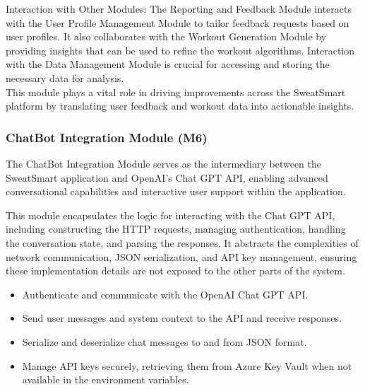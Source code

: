 \documentclass[12pt, titlepage]{article}
\begin{document}
Interaction with Other Modules: The Reporting and Feedback Module interacts with the User Profile Management Module to tailor feedback requests based on user profiles. It also collaborates with the Workout Generation Module by providing insights that can be used to refine the workout algorithms. Interaction with the Data Management Module is crucial for accessing and storing the necessary data for analysis.
\\

This module plays a vital role in driving improvements across the SweatSmart platform by translating user feedback and workout data into actionable insights.

\subsubsection{ChatBot Integration Module (M6)}

The ChatBot Integration Module serves as the intermediary between the SweatSmart application and OpenAI's Chat GPT API, enabling advanced conversational capabilities and interactive user support within the application.

\begin{description}[leftmargin=0pt]
\item[Secrets:] 
This module encapsulates the logic for interacting with the Chat GPT API, including constructing the HTTP requests, managing authentication, handling the conversation state, and parsing the responses. It abstracts the complexities of network communication, JSON serialization, and API key management, ensuring these implementation details are not exposed to the other parts of the system.
\end{description}

\begin{description}[leftmargin=0pt]
\item[Services:]
\end{description}
\begin{itemize}[leftmargin=*]
\item Authenticate and communicate with the OpenAI Chat GPT API.
\item Send user messages and system context to the API and receive responses.
\item Serialize and deserialize chat messages to and from JSON format.
\item Manage API keys securely, retrieving them from Azure Key Vault when not available in the environment variables.
\end{itemize}
\end{document}
